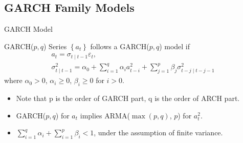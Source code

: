 \documentclass{beamer}
\begin{document}
\subsection{GARCH Family Models}
\begin{frame}{GARCH Model}
  \begin{block}{GARCH($p,q$)}
    Series $\left\{a_{t}\right\}$ follows a GARCH($p,q$) model if
    \begin{displaymath}
      \begin{array}{c}
        a_{t}=\sigma_{t \mid t-1}\varepsilon_{t},\\
        \sigma_{t \mid t-1}^2 = \alpha_{0}+\sum_{i=1}^q{\alpha_{i}a_{t-i}^2} + \sum_{j=1}^p{\beta_{j}\sigma_{t-j \mid t-j-1}^2}
      \end{array}
    \end{displaymath}
    where $\alpha_{0} > 0$, $\alpha_{i} \geq 0$, $\beta_{i} \geq 0$ for $i>0$.
  \end{block}
  \begin{itemize}
    \item Note that p is the order of GARCH part, q is the order of ARCH part.
    \item GARCH($p, q$) for $a_{t}$ implies ARMA($\max(p,q)$, $p$) for $a_{t}^2$.
    \item $\sum_{i=1}^{q}\alpha_{i}+\sum_{i=1}^{p}\beta_{i}<1$, under the assumption of finite variance. 
  \end{itemize}
\end{frame}
\end{document}
